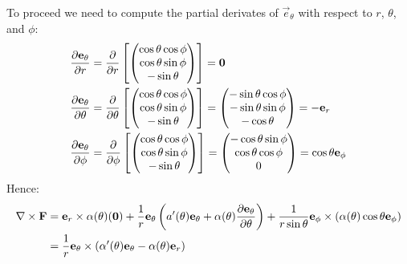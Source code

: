 \documentclass[../main.tex]{subfiles}
\begin{document}
\begin{example}
  To proceed we need to compute the partial derivates of $\vec{e}_\theta$ with respect to $r$, $\theta$, and $\phi$:
  \begin{align*}
    \pderiv{\vec{e}_\theta}{r} &= \pderiv{}{r} \left[\begin{pmatrix}
    \cos \theta \cos \phi \\
    \cos \theta \sin \phi \\
    -\sin \theta \\
    \end{pmatrix}\right] = \vec{0}\\
    \pderiv{\vec{e}_\theta}{\theta} &= \pderiv{}{\theta} \left[\begin{pmatrix}
    \cos \theta \cos \phi \\
    \cos \theta \sin \phi \\
    -\sin \theta \\
    \end{pmatrix}\right] = \begin{pmatrix}
    -\sin \theta \cos \phi \\
    -\sin \theta \sin \phi \\
    -\cos \theta \\
    \end{pmatrix} = -\vec{e}_r \\
    \pderiv{\vec{e}_\theta}{\phi} &= \pderiv{}{\phi} \left[\begin{pmatrix}
    \cos \theta \cos \phi \\
    \cos \theta \sin \phi \\
    -\sin \theta \\
    \end{pmatrix}\right] = \begin{pmatrix}
    -\cos \theta \sin \phi \\
    \cos \theta \cos \phi \\
    0 \\
    \end{pmatrix} = \cos \theta \vec{e}_\phi
  \end{align*}
  Hence:
  \begin{align*}
    \nabla \times \vec{F} &= \vec{e}_r \times \alpha(\theta) (\vec{0}) + \frac{1}{r}\vec{e}_\theta \left(a'(\theta)\vec{e}_\theta + \alpha(\theta) \pderiv{\vec{e}_\theta}{\theta}\right) + \frac{1}{r \sin \theta} \vec{e}_\phi \times (\alpha(\theta) \cos \theta \vec{e}_\phi) \\
                          &= \frac{1}{r}\vec{e}_\theta \times (\alpha'(\theta) \vec{e}_\theta - \alpha(\theta)\vec{e}_r) \\

\end{align*}
\end{example}
\end{document}
